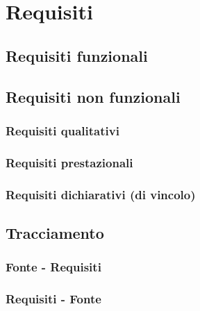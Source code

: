 \section{Requisiti}

\subsection{Requisiti funzionali}

\subsection{Requisiti non funzionali}
\subsubsection{Requisiti qualitativi}
\subsubsection{Requisiti prestazionali}
\subsubsection{Requisiti dichiarativi (di vincolo)}

\subsection{Tracciamento}

\subsubsection{Fonte - Requisiti}
\subsubsection{Requisiti - Fonte}
